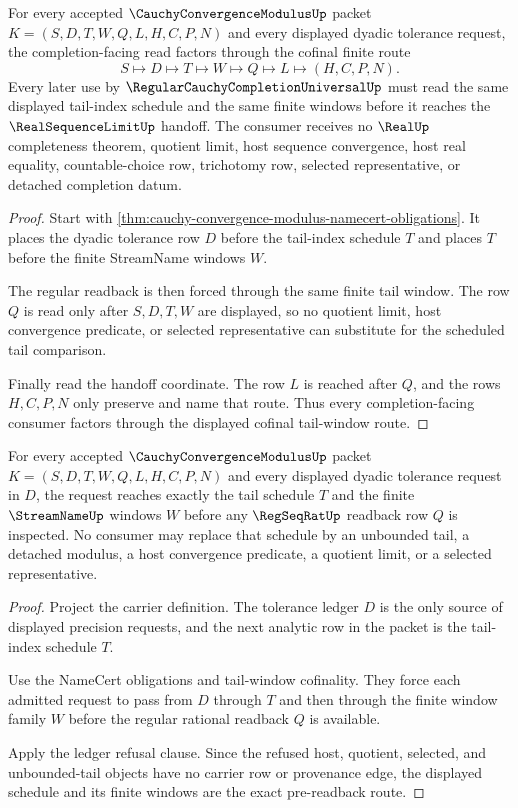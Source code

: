 \begin{theorem}
\label{thm:cauchy-convergence-modulus-tail-window-cofinality}
For every accepted $\CauchyConvergenceModulusUp$ packet $K=(S,D,T,W,Q,L,H,C,P,N)$ and every displayed dyadic tolerance request, the completion-facing read factors through the cofinal finite route
$$
S\longmapsto D\longmapsto T\longmapsto W\longmapsto Q\longmapsto L\longmapsto(H,C,P,N).
$$
Every later use by $\RegularCauchyCompletionUniversalUp$ must read the same displayed tail-index schedule and the same finite windows before it reaches the $\RealSequenceLimitUp$ handoff. The consumer receives no $\RealUp$ completeness theorem, quotient limit, host sequence convergence, host real equality, countable-choice row, trichotomy row, selected representative, or detached completion datum.
\end{theorem}
\begin{proof}
Start with \autoref{thm:cauchy-convergence-modulus-namecert-obligations}. It places the dyadic tolerance row $D$ before the tail-index schedule $T$ and places $T$ before the finite StreamName windows $W$.

The regular readback is then forced through the same finite tail window. The row $Q$ is read only after $S,D,T,W$ are displayed, so no quotient limit, host convergence predicate, or selected representative can substitute for the scheduled tail comparison.

Finally read the handoff coordinate. The row $L$ is reached after $Q$, and the rows $H,C,P,N$ only preserve and name that route. Thus every completion-facing consumer factors through the displayed cofinal tail-window route.
\end{proof}

\begin{theorem}
\label{thm:cauchy-convergence-modulus-tail-window-exactness}
For every accepted $\CauchyConvergenceModulusUp$ packet $K=(S,D,T,W,Q,L,H,C,P,N)$ and every displayed dyadic tolerance request in $D$, the request reaches exactly the tail schedule $T$ and the finite $\StreamNameUp$ windows $W$ before any $\RegSeqRatUp$ readback row $Q$ is inspected. No consumer may replace that schedule by an unbounded tail, a detached modulus, a host convergence predicate, a quotient limit, or a selected representative.
\end{theorem}
\begin{proof}
Project the carrier definition. The tolerance ledger $D$ is the only source of displayed precision requests, and the next analytic row in the packet is the tail-index schedule $T$.

Use the NameCert obligations and tail-window cofinality. They force each admitted request to pass from $D$ through $T$ and then through the finite window family $W$ before the regular rational readback $Q$ is available.

Apply the ledger refusal clause. Since the refused host, quotient, selected, and unbounded-tail objects have no carrier row or provenance edge, the displayed schedule and its finite windows are the exact pre-readback route.
\end{proof}

